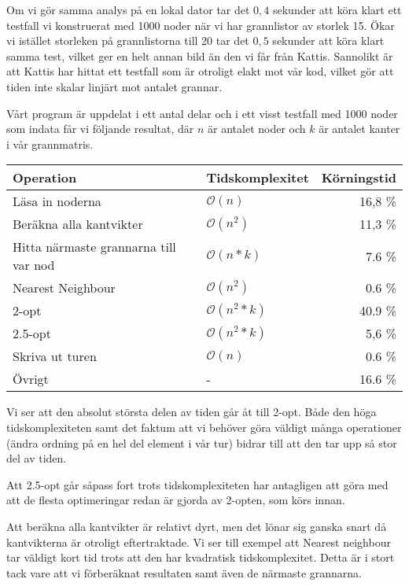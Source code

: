 \documentclass[a4paper,12pt]{article}
\renewcommand{\O}{\ensuremath{\mathcal{O}}}
\renewcommand{\*}{\ensuremath{\cdot}}
\begin{document}
Om vi gör samma analys på en lokal dator tar det $0,4$ sekunder att köra klart
ett testfall vi konstruerat med 1000 noder när vi har grannlistor av storlek 15.
Ökar vi istället storleken på grannlistorna till 20 tar det $0,5$ sekunder att
köra klart samma test, vilket ger en helt annan bild än den vi får från Kattis.
Sannolikt är att Kattis har hittat ett testfall som är otroligt elakt mot vår
kod, vilket gör att tiden inte skalar linjärt mot antalet grannar.

Vårt program är uppdelat i ett antal delar och i ett visst testfall med 1000
noder som indata får vi följande resultat, där $n$ är antalet noder och $k$ är
antalet kanter i vår grannmatris.

\begin{tabular}{| l | l | r |}
    \hline
    Operation                               & Tidskomplexitet & Körningstid \\
    \hline \hline
    Läsa in noderna                          & $\O(n)$      & 16,8 \%  \\
    Beräkna alla kantvikter	                 & $\O(n^2)$    & 11,3 \%  \\    
    Hitta närmaste grannarna till var nod    & $\O(n*k)$    & 7.6 \%   \\    
    Nearest Neighbour                        & $\O(n^2)$    & 0.6 \%   \\    
    2-opt	                                 & $\O(n^2*k)$  & 40.9 \%  \\        
    2.5-opt	                                 & $\O(n^2*k)$  & 5,6 \%   \\        
    Skriva ut turen	                         & $\O(n)$      & 0.6 \%   \\    
    Övrigt	                                 & -            & 16.6 \%  \\
    \hline
\end{tabular}


Vi ser att den absolut största delen av tiden går åt till 2-opt. Både den höga
tidskomplexiteten samt det faktum att vi behöver göra väldigt många operationer
(ändra ordning på en hel del element i vår tur) bidrar till att den tar upp så
stor del av tiden.

Att 2.5-opt går såpass fort trots tidskomplexiteten har antagligen att göra med
att de flesta optimeringar redan är gjorda av 2-opten, som körs innan.

Att beräkna alla kantvikter är relativt dyrt, men det lönar sig ganska snart då
kantvikterna är otroligt eftertraktade. Vi ser till exempel att Nearest
neighbour tar väldigt kort tid trots att den har kvadratisk tidskomplexitet.
Detta är i stort tack vare att vi förberäknat resultaten samt även de närmaste
grannarna. 
\end{document}
